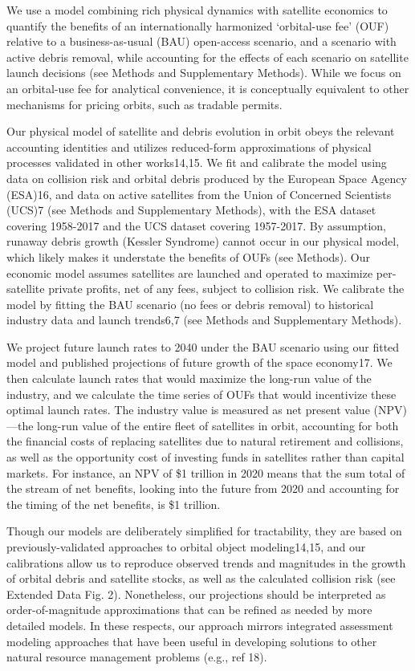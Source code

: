 \documentclass[9pt,twocolumn,twoside,lineno]{pnas-new}
\begin{document}
We use a model combining rich physical dynamics with satellite economics to quantify the benefits of an internationally harmonized ‘orbital-use fee’ (OUF) relative to a business-as-usual (BAU) open-access scenario, and a scenario with active debris removal, while accounting for the effects of each scenario on satellite launch decisions (see Methods and Supplementary Methods). While we focus on an orbital-use fee for analytical convenience, it is conceptually equivalent to other mechanisms for pricing orbits, such as tradable permits.

Our physical model of satellite and debris evolution in orbit obeys the relevant accounting identities and utilizes reduced-form approximations of physical processes validated in other works14,15. We fit and calibrate the model using data on collision risk and orbital debris produced by the European Space Agency (ESA)16, and data on active satellites from the Union of Concerned Scientists (UCS)7 (see Methods and Supplementary Methods), with the ESA dataset covering 1958-2017 and the UCS dataset covering 1957-2017. By assumption, runaway debris growth (Kessler Syndrome) cannot occur in our physical model, which likely makes it understate the benefits of OUFs (see Methods). Our economic model assumes satellites are launched and operated to maximize per-satellite private profits, net of any fees, subject to collision risk. We calibrate the model by fitting the BAU scenario (no fees or debris removal) to historical industry data and launch trends6,7 (see Methods and Supplementary Methods). 

We project future launch rates to 2040 under the BAU scenario using our fitted model and published projections of future growth of the space economy17. We then calculate launch rates that would maximize the long-run value of the industry, and we calculate the time series of OUFs that would incentivize these optimal launch rates. The industry value is measured as net present value (NPV)—the long-run value of the entire fleet of satellites in orbit, accounting for both the financial costs of replacing satellites due to natural retirement and collisions, as well as the opportunity cost of investing funds in satellites rather than capital markets. For instance, an NPV of \$1 trillion in 2020 means that the sum total of the stream of net benefits, looking into the future from 2020 and accounting for the timing of the net benefits, is \$1 trillion.

Though our models are deliberately simplified for tractability, they are based on previously-validated approaches to orbital object modeling14,15, and our calibrations allow us to reproduce observed trends and magnitudes in the growth of orbital debris and satellite stocks, as well as the calculated collision risk (see Extended Data Fig. 2). Nonetheless, our projections should be interpreted as order-of-magnitude approximations that can be refined as needed by more detailed models. In these respects, our approach mirrors integrated assessment modeling approaches that have been useful in developing solutions to other natural resource management problems (e.g., ref 18).  
\end{document}

